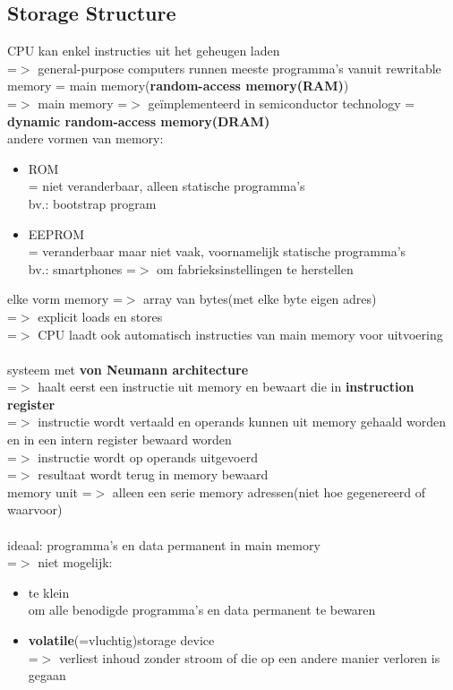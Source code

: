 \documentclass{report}
\begin{document}
\subsection{Storage Structure}
CPU kan enkel instructies uit het geheugen laden
\\=$>$ general-purpose computers runnen meeste programma's vanuit rewritable memory = main memory(\textbf{random-access memory(RAM)})
\\=$>$ main memory =$>$ ge\"implementeerd in semiconductor technology = \textbf{dynamic random-access memory(DRAM)}
\\andere vormen van memory:
\begin{itemize}
\item ROM
\\ = niet veranderbaar, alleen statische programma's
\\bv.: bootstrap program
\item EEPROM
\\ = veranderbaar maar niet vaak, voornamelijk statische programma's
\\bv.: smartphones =$>$ om fabrieksinstellingen te herstellen
\end{itemize}
elke vorm memory =$>$ array van bytes(met elke byte eigen adres)
\\=$>$ explicit loads en stores
\\=$>$ CPU laadt ook automatisch instructies van main memory voor uitvoering
\\
\\ systeem met \textbf{von Neumann architecture}
\\=$>$ haalt eerst een instructie uit memory en bewaart die in \textbf{instruction register}
\\=$>$ instructie wordt vertaald en operands kunnen uit memory gehaald worden en in een intern register bewaard worden
\\=$>$ instructie wordt op operands uitgevoerd
\\=$>$ resultaat wordt terug in memory bewaard
\\memory unit =$>$ alleen een serie memory adressen(niet hoe gegenereerd of waarvoor)
\\
\\ideaal: programma's en data permanent in main memory
\\ =$>$ niet mogelijk:
\begin{itemize}
\item te klein
\\ om alle benodigde programma's en data permanent te bewaren
\item \textbf{volatile}(=vluchtig)storage device
\\=$>$ verliest inhoud zonder stroom of die op een andere manier verloren is gegaan
\end{itemize}
\end{document}
